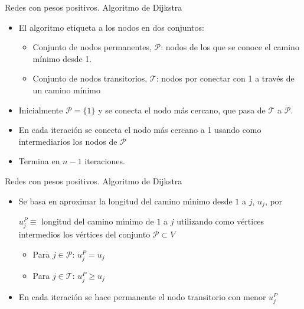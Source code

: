 \documentclass[aspectratio=169]{beamer}
\newcommand{\PP}{\mathcal{P}}
\newcommand{\T}{\mathcal{T}}
\begin{document}
\begin{frame}{Redes con pesos positivos. Algoritmo de Dijkstra}
	
 \begin{itemize}\itemsep 5mm
		\item El algoritmo etiqueta a los nodos en dos conjuntos:
		\begin{itemize}\itemsep 3mm
			\item Conjunto de \alert{nodos permanentes, $\PP$}: nodos de los que se conoce el camino mínimo desde 1.	
						
			\item Conjunto de \alert{nodos transitorios, $\T$}: nodos por conectar con 1 a través de un camino mínimo	
		
		\end{itemize}
		\item Inicialmente $\PP=\{1\}$ y se conecta el nodo más cercano, que pasa de $\T$ a $\PP$.
           \item En cada iteración se conecta el nodo más cercano a 1 usando como intermediarios los nodos de $\PP$
            \item Termina en $n-1$ iteraciones.
		
	\end{itemize}
	
\end{frame}


\begin{frame}{Redes con pesos positivos. Algoritmo de Dijkstra}
	
   \begin{itemize}\itemsep 5mm
		\item 	Se basa en aproximar la longitud del camino m\'{\i}nimo desde $1$ a $j$, $u_j$,
		por
		\begin{center}
			\alert{$ u^P_j \equiv $ longitud del camino m\'{\i}nimo de $1$ a $j$ utilizando como v\'{e}rtices intermedios los v\'{e}rtices del conjunto $\PP\subset V$}
		\end{center}
           \begin{itemize}
		\item Para \alert{$j\in \PP$}: $u^P_j=u_j$		
		\item Para \alert{$j\in \T$}: $u^P_j\geq u_j$		
		\end{itemize}
		\item En cada iteración se hace permanente el nodo transitorio con menor $u^P_j$		
	\end{itemize}
	
\end{frame}
\end{document}
